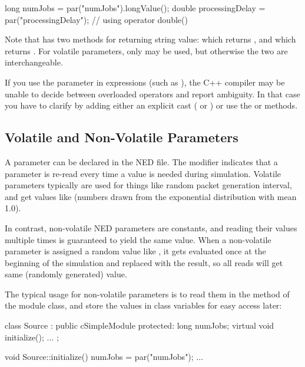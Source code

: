 \begin{cpp}
long numJobs = par("numJobs").longValue();
double processingDelay = par("processingDelay"); // using operator double()
\end{cpp}

Note that  has two methods for returning string value:
 which returns , and
 which returns .
For volatile parameters, only  may be used,
but otherwise the two are interchangeable.

If you use the  parameter in expressions (such as
), the C++ compiler may be unable to decide
between overloaded operators and report ambiguity. In that case
you have to clarify by adding either an explicit cast
( or ) or use
the  or  methods.


\subsection{Volatile and Non-Volatile Parameters}
\label{sec:simple-modules:volatile-parameters}

A parameter can be declared  in the NED file. The 
modifier indicates that a parameter is re-read every time a value is needed
during simulation. Volatile parameters typically are used for things like
random packet generation interval, and get values like 
(numbers drawn from the exponential distribution with mean 1.0).

In contrast, non-volatile NED parameters are constants, and reading their
values multiple times is guaranteed to yield the same value. When a non-volatile
parameter is assigned a random value like , it gets
evaluated once at the beginning of the simulation and replaced with the result,
so all reads will get same (randomly generated) value.

The typical usage for non-volatile parameters is to read them in the
 method of the module class, and store the values
in class variables for easy access later:

\begin{cpp}
class Source : public cSimpleModule
{
  protected:
    long numJobs;
    virtual void initialize();
    ...
};

void Source::initialize()
{
    numJobs = par("numJobs");
    ...
}
\end{cpp}

